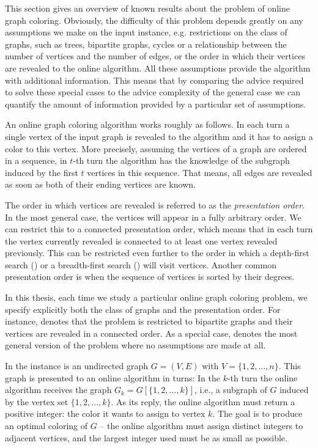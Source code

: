 
This section gives an overview of known results about the problem of
online graph coloring. Obviously, the difficulty of this problem depends
greatly on any assumptions we make on the input instance, e.g.
restrictions on the class of graphs, such as trees, bipartite graphs,
cycles or a relationship between the number of vertices and the number of
edges, or the order in which their vertices are revealed to the online
algorithm. All these assumptions provide the algorithm with additional
information. This means that by comparing the advice required to solve
these special cases to the advice complexity of the general case we can
quantify the amount of information provided by a particular set of
assumptions.

An online graph coloring algorithm works roughly as follows. In each turn
a single vertex of the input graph is revealed to the algorithm and it has
to assign a color to this vertex. More precisely, assuming the vertices of
a graph are ordered in a sequence, in $t$-th turn the algorithm has the
knowledge of the subgraph induced by the first $t$ vertices in this
sequence. That means, all edges are revealed as soon as both of their
ending vertices are known.

The order in which vertices are revealed is referred to as the
\emph{presentation order}. In the most general case, the vertices will
appear in a fully arbitrary order. We can restrict this to a connected
presentation order, which means that in each turn the vertex currently
revealed is connected to at least one vertex revealed previously. This can
be restricted even further to the order in which a depth-first search
() or a breadth-first search () will visit
vertices. Another common presentation order is when the sequence of
vertices is sorted by their degrees.

In this thesis, each time we study a particular online graph coloring
problem, we specify explicitly both the class of graphs and the
presentation order. For instance,  denotes
that the problem is restricted to bipartite graphs and their vertices are
revealed in a connected order. As a special case, 
denotes the most general version of the problem where no assumptions are
made at all.

\begin{definition}\label{def:graph-coloring}
    In  the instance is an undirected graph $G =
    (V, E)$ with $V = \{1, 2, \dots, n\}$. This graph is presented to an
    online algorithm in turns: In the $k$-th turn the online algorithm
    receives the graph $G_k = G[\{1, 2, \dots, k\}]$, i.e., a subgraph of
    $G$ induced by the vertex set $\{1, 2, \dots, k\}$.  As its reply, the
    online algorithm must return a positive integer: the color it wants to
    assign to vertex $k$. The goal is to produce an optimal coloring of
    $G$ -- the online algorithm must assign distinct integers to adjacent
    vertices, and the largest integer used must be as small as possible.
\end{definition}

